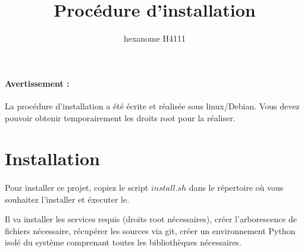 \documentclass[10pt,a4paper]{article}
\author{hexanome H4111}
\title{Procédure d'installation}
\begin{document}
\paragraph{Avertissement : }La procédure d'installation a été écrite et réalisée sous linux/Debian. Vous devez pouvoir obtenir temporairement les droits root pour la réaliser.
\section{Installation}
\paragraph{} Pour installer ce projet, copiez le script $install.sh$ dans le répertoire où vous souhaitez l'installer et éxecuter le.

Il va installer les services requis (droits root nécessaires), créer l'arborescence de fichiers nécessaire, récupérer les sources via git, créer un environnement Python isolé du système comprenant toutes les bibliothèques nécessaires.
\end{document}
